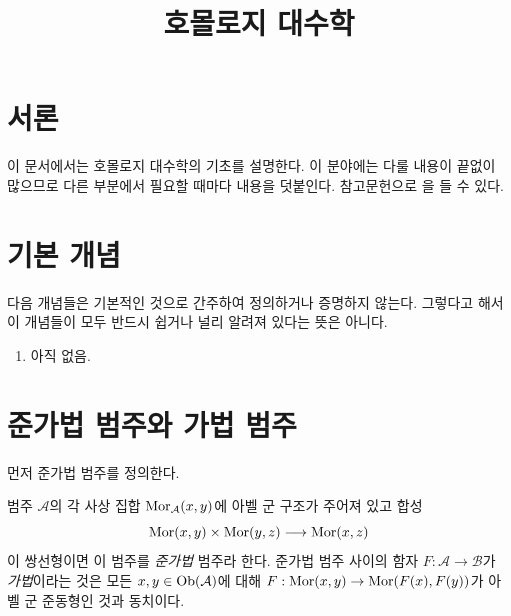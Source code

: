 

%


\title{호몰로지 대수학}


\maketitle

\label{section-phantom}

\tableofcontents

\section{서론}
\label{section-introduction}

\noindent
이 문서에서는 호몰로지 대수학의 기초를 설명한다.
이 분야에는 다룰 내용이 끝없이 많으므로 다른 부분에서 필요할 때마다
내용을 덧붙인다. 참고문헌으로 \cite{Maclane}을 들 수 있다.

\section{기본 개념}
\label{section-topology-basic}

\noindent
다음 개념들은 기본적인 것으로 간주하여 정의하거나 증명하지 않는다.
그렇다고 해서 이 개념들이 모두 반드시 쉽거나 널리 알려져 있다는 뜻은 아니다.

\begin{enumerate}
\item 아직 없음.
\end{enumerate}


















\section{준가법 범주와 가법 범주}
\label{section-additive-categories}

\noindent
먼저 준가법 범주를 정의한다.

\begin{definition}
\label{definition-preadditive}
범주 $\mathcal{A}$의 각 사상 집합 $\mathop{\mathrm{Mor}}\nolimits_\mathcal{A}(x, y)$에 아벨 군 구조가
주어져 있고 합성
$$
\mathop{\mathrm{Mor}}\nolimits(x, y) \times \mathop{\mathrm{Mor}}\nolimits(y, z)
\longrightarrow
\mathop{\mathrm{Mor}}\nolimits(x, z)
$$
이 쌍선형이면 이 범주를 {\it 준가법} 범주라 한다. 준가법 범주 사이의
함자 $F : \mathcal{A} \to \mathcal{B}$가 {\it 가법}이라는 것은 모든
$x, y \in \mathop{\mathrm{Ob}}\nolimits(\mathcal{A})$에 대해
$F : \mathop{\mathrm{Mor}}\nolimits(x, y) \to \mathop{\mathrm{Mor}}\nolimits(F(x), F(y))$가 아벨 군 준동형인 것과 동치이다.
\end{definition}

